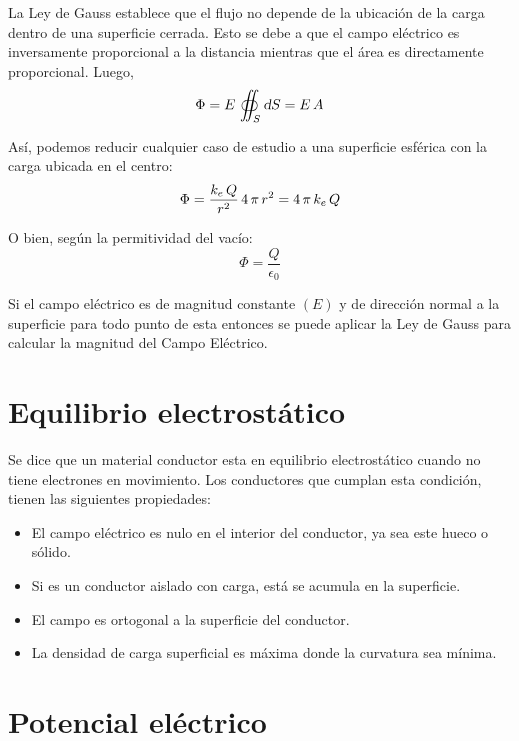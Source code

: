 \documentclass[a5paper,12pt,twoside]{book}
\begin{document}
La Ley de Gauss establece que el flujo no depende de la ubicación de la carga dentro de una superficie cerrada. Esto se debe a que el campo eléctrico es inversamente proporcional a la distancia mientras que el área es directamente proporcional. Luego, 
\begin{equation*}
    \Phi = E \, \oiint_S \textsl{d} S = E \, A
\end{equation*}

Así, podemos reducir cualquier caso de estudio a una superficie esférica con la carga ubicada en el centro:
\begin{equation*}
    \Phi = \frac{k_e \, Q}{r^2} \, 4 \, \pi \, r^2 = 4 \, \pi \, k_e \, Q
\end{equation*}

O bien, según la permitividad del vacío:
\begin{equation*}
    \Phi = \frac{Q}{\epsilon_0}
\end{equation*}

Si el campo eléctrico es de magnitud constante $(E)$ y de dirección normal a la superficie para todo punto de esta entonces se puede aplicar la Ley de Gauss para calcular la magnitud del Campo Eléctrico.


\section{Equilibrio electrostático}

Se dice que un material conductor esta en equilibrio electrostático cuando no tiene electrones en movimiento.
Los conductores que cumplan esta condición, tienen las siguientes propiedades:

\begin{itemize}
\item El campo eléctrico es nulo en el interior del conductor, ya sea este hueco o sólido.

\item Si es un conductor aislado con carga, está se acumula en la superficie.

\item El campo es ortogonal a la superficie del conductor.

\item La densidad de carga superficial es máxima donde la curvatura sea mínima.
\end{itemize}


\section{Potencial eléctrico}
\end{document}
